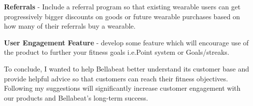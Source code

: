\documentclass[
]{article}
\begin{document}
\textbf{Referrals} - Include a referral program so that existing
wearable users can get progressively bigger discounts on goods or future
wearable purchases based on how many of their referrals buy a wearable.

\textbf{User Engagement Feature} - develop some feature which will
encourage use of the product to further your fitness goals i.e.Point
system or Goals/streaks.

To conclude, I wanted to help Bellabeat better understand its customer
base and provide helpful advice so that customers can reach their
fitness objectives. Following my suggestions will significantly increase
customer engagement with our products and Bellabeat's long-term success.
\end{document}
